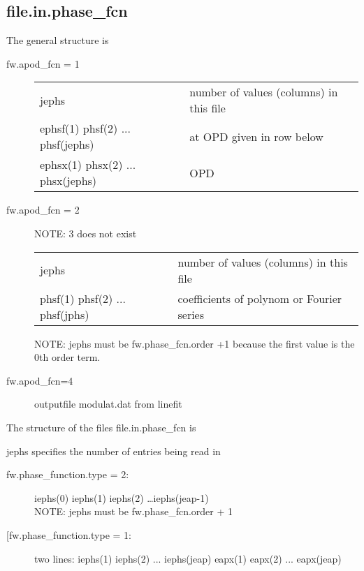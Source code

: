 \documentclass[a4paper]{article}
\begin{document}
\subsection{file.in.phase\_fcn}

The general structure is
\begin{description}
\item[fw.apod\_fcn = 1]\hspace{2cm}
  
  \noindent
  \begin{tabular}{ll}  
    jephs & number of values (columns) in this file\\
    ephsf(1) phsf(2) ... phsf(jephs)& at OPD given in row below\\
    ephsx(1) phsx(2) ... phsx(jephs) & OPD\\
  \end{tabular}
\item[fw.apod\_fcn = 2] NOTE: 3 does not exist
  
  \noindent
  \begin{tabular}{ll}  
    jephs & number of values (columns) in this file\\
    phsf(1) phsf(2) ... phsf(jphs)& coefficients of polynom or Fourier series\\
  \end{tabular}
  NOTE: jephs must be fw.phase\_fcn.order +1 because the first value
  is the 0th order term.
\item[fw.apod\_fcn=4] outputfile modulat.dat from linefit
\end{description}



The structure of the files file.in.phase\_fcn is

\vspace{1cm}
jephs specifies the number of entries being read in\\
\begin{description}
\item[fw.phase\_function.type = 2:] iephs(0) iephs(1) iephs(2) \ldots iephs(jeap-1)\\
  NOTE: jephs must be fw.phase\_fcn.order + 1
\item[[fw.phase\_function.type = 1:] two lines:
  iephs(1) iephs(2) ... iephs(jeap)
  eapx(1) eapx(2) ... eapx(jeap)\\
\end{description}
\end{document}
